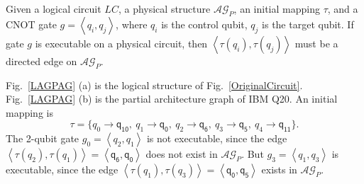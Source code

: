 \documentclass[runningheads]{llncs}
\begin{document}
Given a logical circuit $LC$, a physical structure $\mathcal{AG}_{P}$, an initial mapping $\tau$, and a CNOT gate $g=\left \langle \textit{q}_\textit{i},\textit{q}_\textit{j}\right \rangle $, where $\textit{q}_\textit{i}$ is the control qubit, $\textit{q}_\textit{j}$ is the target qubit.
If gate $g$ is executable on a physical circuit, then
$\left \langle\tau(\textit{q}_\textit{i}),\tau(\textit{q}_\textit{j})\right \rangle $ 
must be a directed edge on $\mathcal{AG}_{P}$.

\begin{example}
	Fig.~\ref{LAGPAG} (a) is the logical structure of Fig.~\ref{OriginalCircuit}. 
	Fig.~\ref{LAGPAG} (b) is the partial architecture graph of IBM Q20. An initial mapping is 
	$$\tau=\{\textit{q}_\textit{0}\rightarrow  \textsf{q}_{\textsf{10}},\ \textit{q}_\textit{1}\rightarrow \textsf{q}_{\textsf{0}},\ 
	\textit{q}_\textit{2}\rightarrow  \textsf{q}_{\textsf{6}},\ \textit{q}_\textit{3}\rightarrow  \textsf{q}_{\textsf{5}},\ \textit{q}_\textit{4}\rightarrow  \textsf{q}_{\textsf{11}}\} .$$
The 2-qubit gate	$g_{0}=\left \langle \textit{q}_\textit{2},\textit{q}_\textit{1}\right \rangle $ is not executable, since the edge $\left \langle \tau(\textit{q}_\textit{2}),\tau(\textit{q}_\textit{1})\right \rangle =\left \langle \textsf{q}_{\textsf{6}},\textsf{q}_{\textsf{0}}\right \rangle $ does not exist in $\mathcal{AG}_{P}$.
	But $g_{3}=\left \langle \textit{q}_\textit{1},\textit{q}_\textit{3}\right \rangle $ is executable, since 
	the edge $\left \langle \tau(\textit{q}_\textit{1}),\tau(\textit{q}_\textit{3})\right \rangle =\left \langle \textsf{q}_{\textsf{0}},\textsf{q}_{\textsf{5}}\right \rangle $  exists in $\mathcal{AG}_{P}$.
\end{example}
\end{document}
